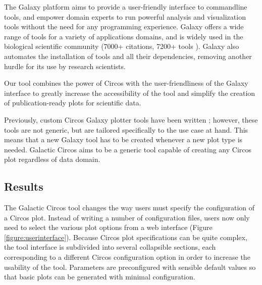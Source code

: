 The Galaxy platform \cite{afgan2018galaxy} aims to provide a user-friendly interface to commandline tools, and empower domain experts to run powerful analysis and visualization tools without the need for any programming experience. Galaxy offers a wide range of tools for a variety of applications domains, and is widely used in the biological scientific community (7000+ citations, 7200+ tools \cite{galaxycitations,galaxytoolshed}). Galaxy also automates the installation of tools and all their dependencies, removing another hurdle for its use by research scientists.

Our tool combines the power of Circos with the user-friendliness of the Galaxy interface to greatly increase the accessibility of the tool and simplify the creation of publication-ready plots for scientific data.

Previously, custom Circos Galaxy plotter tools have been written \cite{hiltemann2014cgtag}; however, these tools are not generic, but are tailored specifically to the use case at hand. This means that a new Galaxy tool has to be created whenever a new plot type is needed. Galactic Circos aims to be a generic tool capable of creating any Circos plot regardless of data domain.

\subsection*{Results}
The Galactic Circos tool changes the way users must specify the configuration of a Circos plot. Instead of writing a number of configuration files, users now only need to select the various plot options from a web interface (Figure \ref{figure:userinterface}). Because Circos plot specifications can be quite complex, the tool interface is subdivided into several collapsible sections, each corresponding to a different Circos configuration option in order to increase the usability of the tool. Parameters are preconfigured with sensible default values so that basic plots can be generated with minimal configuration.

